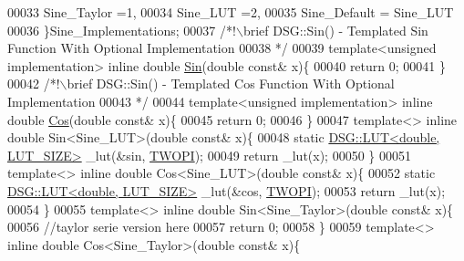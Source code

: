 \begin{DoxyCode}
00033             Sine\_Taylor =1,
00034             Sine\_LUT =2,
00035             Sine\_Default = Sine\_LUT
00036         \}Sine\_Implementations;\textcolor{comment}{}
00037 \textcolor{comment}{        /*!\(\backslash\)brief DSG::Sin() - Templated Sin Function With Optional Implementation}
00038 \textcolor{comment}{         */}
00039         \textcolor{keyword}{template}<\textcolor{keywordtype}{unsigned} implementation> \textcolor{keyword}{inline} \textcolor{keywordtype}{double} \hyperlink{namespace_d_s_g_aad63d316081c7d13a551acf346ee2749}{Sin}(\textcolor{keywordtype}{double} \textcolor{keyword}{const}& x)\{
00040             \textcolor{keywordflow}{return} 0;
00041         \}\textcolor{comment}{}
00042 \textcolor{comment}{        /*!\(\backslash\)brief DSG::Sin() - Templated Cos Function With Optional Implementation}
00043 \textcolor{comment}{         */}
00044         \textcolor{keyword}{template}<\textcolor{keywordtype}{unsigned} implementation> \textcolor{keyword}{inline} \textcolor{keywordtype}{double} \hyperlink{namespace_d_s_g_ade303ad15c77f534429305c3cbd90191}{Cos}(\textcolor{keywordtype}{double} \textcolor{keyword}{const}& x)\{
00045             \textcolor{keywordflow}{return} 0;
00046         \}
00047         \textcolor{keyword}{template}<> \textcolor{keyword}{inline} \textcolor{keywordtype}{double} Sin<Sine\_LUT>(\textcolor{keywordtype}{double} \textcolor{keyword}{const}& x)\{
00048             \textcolor{keyword}{static} \hyperlink{class_d_s_g_1_1_l_u_t}{DSG::LUT<double, LUT\_SIZE>} \_lut(&sin,
      \hyperlink{_p_i_8h_a4912c64aec0c943b7985db6cb61ff83a}{TWOPI});
00049             \textcolor{keywordflow}{return} \_lut(x);
00050         \}
00051         \textcolor{keyword}{template}<> \textcolor{keyword}{inline} \textcolor{keywordtype}{double} Cos<Sine\_LUT>(\textcolor{keywordtype}{double} \textcolor{keyword}{const}& x)\{
00052             \textcolor{keyword}{static} \hyperlink{class_d_s_g_1_1_l_u_t}{DSG::LUT<double, LUT\_SIZE>} \_lut(&cos,
      \hyperlink{_p_i_8h_a4912c64aec0c943b7985db6cb61ff83a}{TWOPI});
00053             \textcolor{keywordflow}{return} \_lut(x);
00054         \}
00055         \textcolor{keyword}{template}<> \textcolor{keyword}{inline} \textcolor{keywordtype}{double} Sin<Sine\_Taylor>(\textcolor{keywordtype}{double} \textcolor{keyword}{const}& x)\{
00056             \textcolor{comment}{//taylor serie version here}
00057             \textcolor{keywordflow}{return} 0;
00058         \}
00059         \textcolor{keyword}{template}<> \textcolor{keyword}{inline} \textcolor{keywordtype}{double} Cos<Sine\_Taylor>(\textcolor{keywordtype}{double} \textcolor{keyword}{const}& x)\{

\end{DoxyCode}
